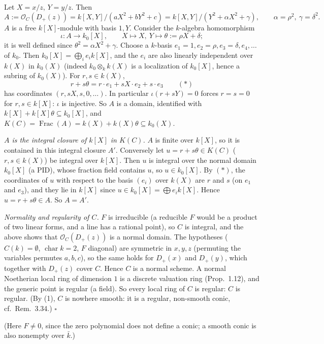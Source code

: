\documentclass[11pt]{article}
\begin{document}
Let $X=x/z$, $Y=y/z$. Then
\[ A:=\mathcal O_C(D_+(z))=k[X,Y]/(aX^2+bY^2+c)=k[X,Y]/(Y^2+\alpha X^2+\gamma),\qquad \alpha=\rho^2,\ \gamma=\delta^2. \]
$A$ is a free $k[X]$-module with basis $1,Y$. Consider the $k$-algebra homomorphism
\[ \iota:A\to k_0[X],\qquad X\mapsto X,\ Y\mapsto\theta:=\rho X+\delta; \]
it is well defined since $\theta^2=\alpha X^2+\gamma$. Choose a $k$-basis $e_1=1,e_2=\rho,e_3=\delta,e_4,\dots$ of $k_0$. Then $k_0[X]=\bigoplus_ie_ik[X]$, and the $e_i$ are also linearly independent over $k(X)$ in $k_0(X)$ (indeed $k_0\otimes_kk(X)$ is a localization of $k_0[X]$, hence a subring of $k_0(X)$). For $r,s\in k(X)$,
\[ r+s\theta=r\cdot e_1+sX\cdot e_2+s\cdot e_3\qquad(*) \]
has coordinates $(r,sX,s,0,\dots)$. In particular $\iota(r+sY)=0$ forces $r=s=0$ for $r,s\in k[X]$: $\iota$ is injective. So $A$ is a domain, identified with $k[X]+k[X]\theta\subseteq k_0[X]$, and $K(C)=\operatorname{Frac}(A)=k(X)+k(X)\theta\subseteq k_0(X)$.

\emph{$A$ is the integral closure of $k[X]$ in $K(C)$.} $A$ is finite over $k[X]$, so it is contained in this integral closure $A'$. Conversely let $u=r+s\theta\in K(C)$ ($r,s\in k(X)$) be integral over $k[X]$. Then $u$ is integral over the normal domain $k_0[X]$ (a PID), whose fraction field contains $u$, so $u\in k_0[X]$. By $(*)$, the coordinates of $u$ with respect to the basis $(e_i)$ over $k(X)$ are $r$ and $s$ (on $e_1$ and $e_3$), and they lie in $k[X]$ since $u\in k_0[X]=\bigoplus e_ik[X]$. Hence $u=r+s\theta\in A$. So $A=A'$.

\emph{Normality and regularity of $C$.} $F$ is irreducible (a reducible $F$ would be a product of two linear forms, and a line has a rational point), so $C$ is integral, and the above shows that $\mathcal O_C(D_+(z))$ is a normal domain. The hypotheses ($C(k)=\emptyset$, $\operatorname{char}k=2$, $F$ diagonal) are symmetric in $x,y,z$ (permuting the variables permutes $a,b,c$), so the same holds for $D_+(x)$ and $D_+(y)$, which together with $D_+(z)$ cover $C$. Hence $C$ is a normal scheme. A normal Noetherian local ring of dimension $1$ is a discrete valuation ring (Prop.~1.12), and the generic point is regular (a field). So every local ring of $C$ is regular: $C$ is regular. (By (1), $C$ is nowhere smooth: it is a regular, non-smooth conic, cf.\ Rem.~3.34.) \hfill$\square$

\pf
(Here $F\neq0$, since the zero polynomial does not define a conic; a smooth conic is also nonempty over $\bar k$.)
\end{document}
